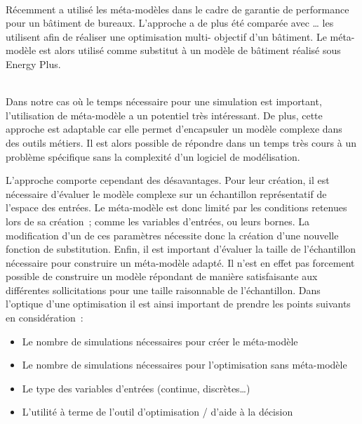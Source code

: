 ~\\
Récemment  a utilisé les méta-modèles dans le cadre de garantie de
performance pour un bâtiment de bureaux. L’approche a de plus été comparée avec \dots
\textcite{Armand-Decker2015} les utilisent afin de réaliser une optimisation multi-
objectif d’un bâtiment. Le méta-modèle est alors utilisé comme substitut à un modèle de
bâtiment réalisé sous Energy Plus.

~\\
Dans notre cas où le temps nécessaire pour une simulation est important, l’utilisation de
méta-modèle a un potentiel très intéressant. De plus, cette approche est adaptable car elle
permet d’encapsuler un modèle complexe dans des outils métiers. Il est alors possible de
répondre dans un temps très cours à un problème spécifique sans la complexité d’un
logiciel de modélisation.

L’approche comporte cependant des désavantages. Pour leur création, il est nécessaire
d’évaluer le modèle complexe sur un échantillon représentatif de l’espace des entrées.
Le méta-modèle est donc limité par les conditions retenues lors de sa création~; comme
les variables d’entrées, ou leurs bornes. La modification d’un de ces paramètres nécessite
donc la création d’une nouvelle fonction de substitution.
Enfin, il est important d’évaluer la taille de l’échantillon nécessaire pour construire
un méta-modèle adapté. Il n’est en effet pas forcement possible de construire un modèle
répondant de manière satisfaisante aux différentes sollicitations pour une taille raisonnable
de l’échantillon.
Dans l’optique d’une optimisation il est ainsi important de prendre les points
suivants en considération~:
\begin{itemize}
  \item Le nombre de simulations nécessaires pour créer le méta-modèle
  \item Le nombre de simulations nécessaires pour l’optimisation sans méta-modèle
  \item Le type des variables d’entrées (continue, discrètes\dots)
  \item L’utilité à terme de l’outil d’optimisation / d’aide à la décision
\end{itemize}


